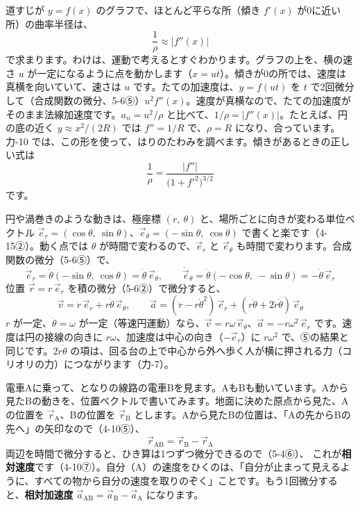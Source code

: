 \begin{motto}[4]
\label{ph:力-1:kyokuritsu}道すじが $y=f(x)$ のグラフで、ほとんど平らな所（傾き $f'(x)$ が0に近い所）の曲率半径は、
\[ \frac{1}{\rho}\approx|f''(x)| \]
で求まります。わけは、運動で考えるとすぐわかります。グラフの上を、横の速さ $u$ が一定になるように点を動かします（$x=ut$）。傾きが0の所では、速度は真横を向いていて、速さは $u$ です。たての加速度は、$y=f(ut)$ を $t$ で2回微分して（合成関数の微分、\mbox{5-6⑤}）$u^2f''(x)$。速度が真横なので、たての加速度がそのまま法線加速度です。$a_n=u^2/\rho$ と比べて、$1/\rho=|f''(x)|$。たとえば、円の底の近く $y\approx x^2/(2R)$ では $f''=1/R$ で、$\rho=R$ になり、合っています。力-10 では、この形を使って、はりのたわみを調べます。傾きがあるときの正しい式は
\[ \frac{1}{\rho}=\frac{|f''|}{\bigl(1+f'^2\bigr)^{3/2}} \]
です。
\end{motto}

\begin{motto}[4]
円や渦巻きのような動きは、極座標 $(r,\ \theta)$ と、場所ごとに向きが変わる単位ベクトル $\vec e_r=(\cos\theta,\ \sin\theta)$、$\vec e_\theta=(-\sin\theta,\ \cos\theta)$ で書くと楽です（\mbox{4-15②}）。動く点では $\theta$ が時間で変わるので、$\vec e_r$ と $\vec e_\theta$ も時間で変わります。合成関数の微分（\mbox{5-6⑤}）で、
\[ \dot{\vec e}_r=\dot\theta(-\sin\theta,\ \cos\theta)=\dot\theta\,\vec e_\theta,\qquad \dot{\vec e}_\theta=\dot\theta(-\cos\theta,\ -\sin\theta)=-\dot\theta\,\vec e_r \]
位置 $\vec r=r\,\vec e_r$ を積の微分（\mbox{5-6②}）で微分すると、
\[ \vec v=\dot r\,\vec e_r+r\dot\theta\,\vec e_\theta,\qquad \vec a=(\ddot r-r\dot\theta^2)\,\vec e_r+(r\ddot\theta+2\dot r\dot\theta)\,\vec e_\theta \]
$r$ が一定、$\dot\theta=\omega$ が一定（等速円運動）なら、$\vec v=r\omega\,\vec e_\theta$、$\vec a=-r\omega^2\,\vec e_r$ です。速度は円の接線の向きに $r\omega$、加速度は中心の向き（$-\vec e_r$）に $r\omega^2$ で、⑤の結果と同じです。$2\dot r\dot\theta$ の項は、回る台の上で中心から外へ歩く人が横に押される力（コリオリの力）につながります（力-7）。
\end{motto}


\leavevmode\label{ph:力-1:sec6}\label{ph:力-1:soutai}電車Aに乗って、となりの線路の電車Bを見ます。AもBも動いています。Aから見たBの動きを、位置ベクトルで書いてみます。地面に決めた原点から見た、Aの位置を $\vec r_{\mathrm A}$、Bの位置を $\vec r_{\mathrm B}$ とします。Aから見たBの位置は、「Aの先からBの先へ」の矢印なので（4-10⑤）、
\[ \vec r_{\mathrm{AB}}=\vec r_{\mathrm B}-\vec r_{\mathrm A} \]
両辺を時間で微分すると、ひき算は1つずつ微分できるので（\mbox{5-4⑥}）、
これが\textbf{相対速度}です（4-10⑦）。自分（A）の速度をひくのは、「自分が止まって見えるように、すべての物から自分の速度を取りのぞく」ことです。もう1回微分すると、\textbf{相対加速度} $\vec a_{\mathrm{AB}}=\vec a_{\mathrm B}-\vec a_{\mathrm A}$ になります。

